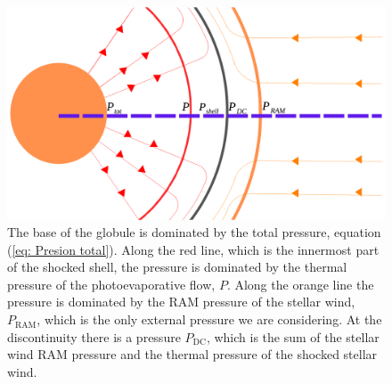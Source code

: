 \documentclass{book}
\begin{document}
\begin{figure}[htb]
    \centering    \includegraphics[width=\textwidth]{imagenes_corregidas/Arreglo 03.pdf}
    \caption{The base of the globule is dominated by the total
      pressure, equation (\ref{eq: Presion total}). Along the red
      line, which is the innermost part of the shocked shell, the
      pressure is dominated by the thermal pressure of the
      photoevaporative flow, $P$. Along the orange line the pressure
      is dominated by the RAM pressure of the stellar wind,
      $P_\mathrm{RAM}$, which is the only external pressure we are
      considering. At the discontinuity there is a pressure
      $P_\mathrm{DC}$, which is the sum of the stellar wind RAM
      pressure and the thermal pressure of the shocked stellar wind.}
    \label{fig:zones_presiones}
\end{figure}







\end{document}
